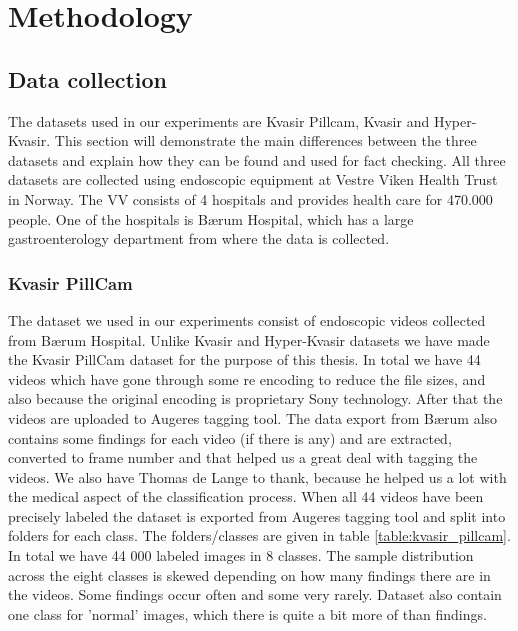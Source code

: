 \documentclass[thesis.tex]{subfiles}
\begin{document}
\chapter{Methodology} \label{methodology}


\section{Data collection} \label{datacollection}
The datasets used in our experiments are Kvasir Pillcam, Kvasir and Hyper-Kvasir. This section will demonstrate the main differences between the three datasets and explain how they can be found and used for fact checking. All three datasets are collected using endoscopic equipment at Vestre Viken Health Trust in Norway. The VV consists of 4 hospitals and provides health care for 470.000 people. One of the hospitals is Bærum Hospital, which has a large gastroenterology department from where the data is collected. 

\subsection{Kvasir PillCam} \label{kvasir_pillcam}
The dataset we used in our experiments consist of endoscopic videos collected from Bærum Hospital. Unlike Kvasir and Hyper-Kvasir datasets we have made the Kvasir PillCam dataset for the purpose of this thesis. In total we have 44 videos which have gone through some re encoding to reduce the file sizes, and also because the original encoding is proprietary Sony technology. After that the videos are uploaded to Augeres tagging tool. The data export from Bærum also contains some findings for each video (if there is any) and are extracted, converted to frame number and that helped us a great deal with tagging the videos. We also have Thomas de Lange to thank, because he helped us a lot with the medical aspect of the classification process. When all 44 videos have been precisely labeled the dataset is exported from Augeres tagging tool and split into folders for each class. The folders/classes are given in table \ref{table:kvasir_pillcam}. In total we have 44 000 labeled images in 8 classes. The sample distribution across the eight classes is skewed depending on how many findings there are in the videos. Some findings occur often and some very rarely. Dataset also contain one class for 'normal' images, which there is quite a bit more of than findings. 
\end{document}
